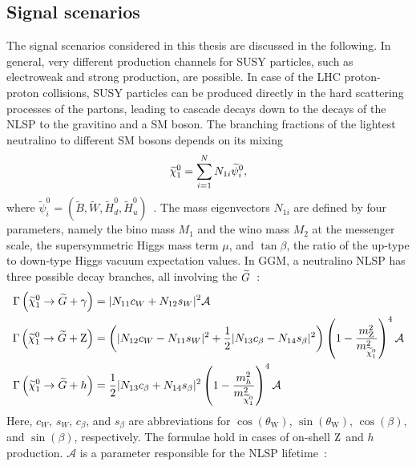 \subsection{Signal scenarios}\label{sec:SMS}
The signal scenarios considered in this thesis are discussed in the following. In general, very different production channels for SUSY particles, such as electroweak and strong production, are possible. In case of the LHC proton-proton collisions, SUSY particles can be produced directly in the hard scattering processes of the partons, leading to cascade decays down to the decays of the NLSP to the gravitino and a SM boson. The branching fractions of the lightest neutralino to different SM bosons depends on its mixing
\begin{equation}
 \widetilde{\chi}^{0}_{1} = \sum_{i=1}^{N} N_{1i} \widetilde{\psi}_i^0,
\end{equation}
where $\widetilde{\psi}_i^0=(\widetilde{B},\widetilde{W},\widetilde{H}_d^0,\widetilde{H}_u^0)$~\cite{NLSPDecay}. The mass eigenvectors $N_{1i}$ are defined by four parameters, namely the bino mass $M_1$ and the wino mass $M_2$ at the messenger scale, the supersymmetric Higgs mass term $\mu$, and $\tan{\beta}$, the ratio of the up-type to down-type Higgs vacuum expectation values. In GGM, a neutralino NLSP has three possible decay branches, all involving the $\widetilde{G}$~\cite{NLSPDecay}:
\begin{align}
 \Gamma\left(\widetilde{\chi}^{0}_{1}\to\widetilde{G}+\gamma\right) & = |N_{11}c_W+N_{12}s_W|^2 \mathcal{A}                                                                                                                       \\
 \Gamma\left(\widetilde{\chi}^{0}_{1}\to\widetilde{G}+\mathrm{Z}\right)  & = \left(|N_{12}c_W - N_{11}s_W|^2 +\frac{1}{2}|N_{13}c_{\beta}-N_{14}s_{\beta}|^2\right)\left(1-\frac{m_{\mathrm{Z}}^2}{m_{\widetilde{\chi}^{0}_{1}}^2}\right)^4 \mathcal{A} \\
 \Gamma\left(\widetilde{\chi}^{0}_{1}\to\widetilde{G}+h\right)    & = \frac{1}{2}|N_{13}c_{\beta}+N_{14}s_{\beta}|^2\left(1-\frac{m_{h}^{2}}{m_{\widetilde{\chi}^{0}_{1}}^2}\right)^4 \mathcal{A}                                         
\end{align}
Here, $c_W$, $s_W$, $c_\beta$, and $s_\beta$ are abbreviations for $\cos(\theta_{\text{W}})$, $\sin(\theta_{\text{W}})$, $\cos(\beta)$, and $\sin(\beta)$, respectively. The formulae hold in cases of on-shell $\mathrm{Z}$ and $h$ production. $\mathcal{A}$ is a parameter responsible for the NLSP lifetime~\cite{NLSP1,NLSP2}:
